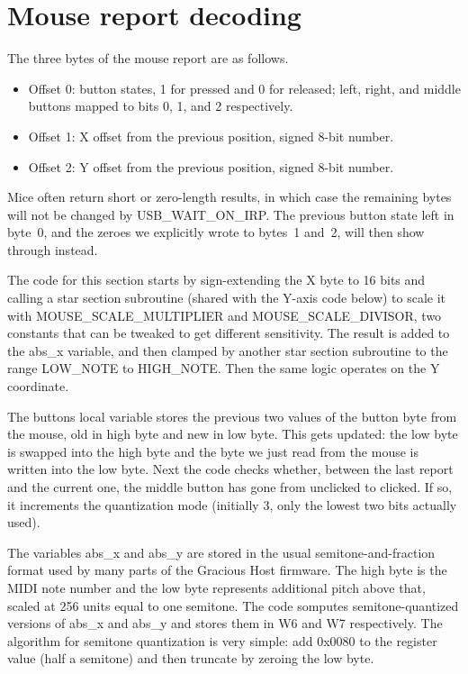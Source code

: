 \section{Mouse report decoding}

The three bytes of the mouse report are as follows.
\begin{itemize}
  \item Offset 0:  button states, 1 for pressed and 0 for released; left,
    right, and middle buttons mapped to bits 0, 1, and 2 respectively.
  \item Offset 1: X offset from the previous position, signed 8-bit number.
  \item Offset 2: Y offset from the previous position, signed 8-bit number.
\end{itemize}

Mice often return short or zero-length results, in which case the remaining
bytes will not be changed by USB\_WAIT\_ON\_IRP.  The previous button state
left in byte~0, and the zeroes we explicitly wrote to bytes~1 and~2, will
then show through instead.

The code for this section starts by sign-extending the X byte to 16 bits and
calling a star section subroutine (shared with the Y-axis code below) to
scale it with MOUSE\_SCALE\_MULTIPLIER and MOUSE\_SCALE\_DIVISOR, two
constants that can be tweaked to get different sensitivity.  The result is
added to the abs\_x variable, and then clamped by another star section
subroutine to the range LOW\_NOTE to HIGH\_NOTE.  Then the same logic
operates on the Y coordinate.

The buttons local variable stores the previous two values of the button byte
from the mouse, old in high byte and new in low byte.  This gets updated:
the low byte is swapped into the high byte and the byte we just read from the
mouse is written into the low byte.  Next the code checks whether, between
the last report and the current one, the middle button has gone from
unclicked to clicked.  If so, it increments the quantization mode (initially
3, only the lowest two bits actually used).

The variables abs\_x and abs\_y are stored in the usual
semitone-and-fraction format used by many parts of the Gracious Host
firmware.  The high byte is the MIDI note number and the low byte represents
additional pitch above that, scaled at 256 units equal to one semitone.  The
code somputes semitone-quantized versions of abs\_x and abs\_y and stores
them in W6 and W7 respectively.  The algorithm for semitone quantization is
very simple:  add 0x0080 to the register value (half a semitone) and then
truncate by zeroing the low byte.

